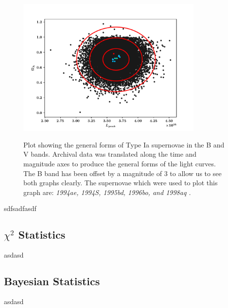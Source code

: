 \documentclass[twocolumn]{revtex4}
\begin{document}
\begin{figure}[!h]
\begin{center}
\includegraphics[width=9.25cm]{results/ol_lp_complete}
\caption[]{Plot showing the general forms of Type Ia supernovae in the B and V bands. Archival data was translated along the time and magnitude axes to produce the general forms of the light curves. The B band has been offset by a magnitude of $3$ to allow us to see both graphs clearly. The supernovae which were used to plot this graph are: \em{1994ae, 1994S, 1995bd, 1996bo, }\em  and \em{1998aq }\em \cite{jha, matheson}. }
\vspace{-3ex}
\label{fig:ol_lp_complete}
\end{center}
\end{figure}

sdfsadfasdf

\vspace{-3ex}
\subsection{$\chi^2$ Statistics} 
\vspace{-2ex}

asdasd

\vspace{-3ex}
\subsection{Bayesian Statistics} 
\vspace{-2ex}

asdasd
\end{document}
